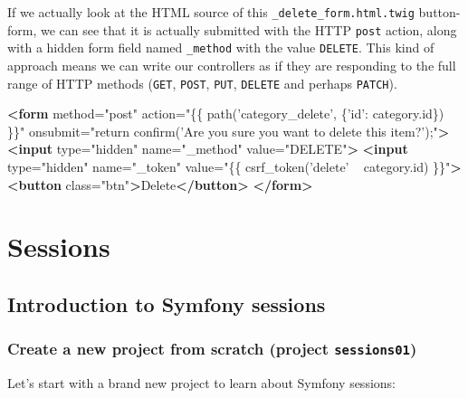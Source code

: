 \documentclass[a4paperpaper,openright]{book}
\newenvironment{Shaded}{}{}
\newcommand{\KeywordTok}[1]{\textcolor[rgb]{0.00,0.44,0.13}{\textbf{#1}}}
\newcommand{\NormalTok}[1]{#1}
\newcommand{\OtherTok}[1]{\textcolor[rgb]{0.00,0.44,0.13}{#1}}
\newcommand{\StringTok}[1]{\textcolor[rgb]{0.25,0.44,0.63}{#1}}
\begin{document}
If we actually look at the HTML source of this
\texttt{\_delete\_form.html.twig} button-form, we can see that it is
actually submitted with the HTTP \texttt{post} action, along with a
hidden form field named \texttt{\_method} with the value
\texttt{DELETE}. This kind of approach means we can write our
controllers as if they are responding to the full range of HTTP methods
(\texttt{GET}, \texttt{POST}, \texttt{PUT}, \texttt{DELETE} and perhaps
\texttt{PATCH}).

\begin{Shaded}
\begin{Highlighting}[]
    \KeywordTok{<form}\OtherTok{ method=}\StringTok{"post"}\OtherTok{ action=}\StringTok{"\{\{ path('category_delete', \{'id': category.id\}) \}\}"}\OtherTok{ onsubmit=}\StringTok{"return confirm('Are you sure you want to delete this item?');"}\KeywordTok{>}
        \KeywordTok{<input}\OtherTok{ type=}\StringTok{"hidden"}\OtherTok{ name=}\StringTok{"_method"}\OtherTok{ value=}\StringTok{"DELETE"}\KeywordTok{>}
        \KeywordTok{<input}\OtherTok{ type=}\StringTok{"hidden"}\OtherTok{ name=}\StringTok{"_token"}\OtherTok{ value=}\StringTok{"\{\{ csrf_token('delete' ~ category.id) \}\}"}\KeywordTok{>}
        \KeywordTok{<button}\OtherTok{ class=}\StringTok{"btn"}\KeywordTok{>}\NormalTok{Delete}\KeywordTok{</button>}
    \KeywordTok{</form>}
\end{Highlighting}
\end{Shaded}

\part{Sessions}

\hypertarget{introduction-to-symfony-sessions}{%
\chapter{Introduction to Symfony
sessions}\label{introduction-to-symfony-sessions}}

\hypertarget{create-a-new-project-from-scratch-project-sessions01}{%
\section{\texorpdfstring{Create a new project from scratch (project
\texttt{sessions01})}{Create a new project from scratch (project sessions01)}}\label{create-a-new-project-from-scratch-project-sessions01}}

Let's start with a brand new project to learn about Symfony sessions:
\end{document}
